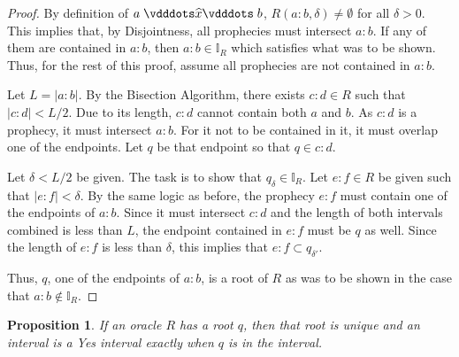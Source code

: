 \documentclass[12pt]{article}
\newtheorem{proposition}{Proposition}[section]
\begin{document}
\begin{proof}
    By definition of $a \xora b$, $R(a:b, \delta) \neq \emptyset$ for all $\delta > 0$. This implies that, by Disjointness, all prophecies must intersect $a:b$. If any of them are contained in $a:b$, then $a:b \in \mathbb{I}_R$ which satisfies what was to be shown. Thus, for the rest of this proof, assume all prophecies are not contained in $a:b$.

    Let $L = |a:b|$. By the Bisection Algorithm, there exists $c:d \in R$ such that $|c:d| < L/2$. Due to its length, $c:d$ cannot contain both $a$ and $b$. As $c:d$ is a prophecy, it must intersect $a:b$. For it not to be contained in it, it must overlap one of the endpoints. Let $q$ be that endpoint so that $q \in c:d$.
    
    Let $\delta < L/2$ be given. The task is to show that $q_{\delta} \in \mathbb{I}_R$. Let $e:f \in R$ be given such that $|e:f| < \delta$. By the same logic as before, the prophecy $e:f$ must contain one of the endpoints of $a:b$. Since it must intersect $c:d$ and the length of both intervals combined is less than $L$, the endpoint contained in $e:f$ must be $q$ as well. Since the length of $e:f$ is less than $\delta$, this implies that $e:f \subset q_{\delta'}$.

    Thus, $q$, one of the endpoints of $a:b$, is a root of $R$ as was to be shown in the case that $a:b \notin \mathbb{I}_R$.
\end{proof}

\begin{proposition}\label{os:singular}
    If an oracle $R$ has a root $q$, then that root is unique and an interval is a Yes interval exactly when $q$ is in the interval.
\end{proposition}
\end{document}
